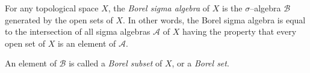 \documentclass{article}
\begin{document}
For any topological space $X$, the \emph{Borel sigma algebra} of $X$ is the $\sigma$--algebra $\mathcal{B}$ generated by the open sets of $X$. In other words, the Borel sigma algebra is equal to the intersection of all sigma algebras $\mathcal{A}$ of $X$ having the property that every open set of $X$ is an element of $\mathcal{A}$.

An element of $\mathcal{B}$ is called a \emph{Borel subset} of $X$, or a \emph{Borel set}.
\end{document}
